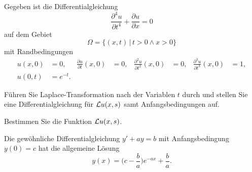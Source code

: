 Gegeben ist die Differentialgleichung
\begin{equation}
\frac{\partial^4 u}{\partial t^4}
+
\frac{\partial u}{\partial x}
=
0
\label{50000013:dgl}
\end{equation}
auf dem Gebiet
\[
\Omega = \{ (x,t)\,|\, t>0\wedge x > 0\}
\]
mit Randbedingungen
\begin{equation}
\begin{aligned}
u(x,0)&=0,
&
\frac{\partial u}{\partial t}(x,0)
&=
0,
&
\frac{\partial^2 u}{\partial t^2}(x,0)
&=
0,
&
\frac{\partial^3 u}{\partial t^3}(x,0)
&=1,
\\
u(0,t)&=e^{-t}.
\end{aligned}
\end{equation}
\begin{teilaufgaben}
\item
Führen Sie Laplace-Transformation nach der Variablen $t$ durch und
stellen Sie eine Differentialgleichung für ${\cal L}u(x,s)$ samt
Anfangsbedingungen auf.
\item
Bestimmen Sie die Funktion ${\cal L}u(x,s)$.
\end{teilaufgaben}

\begin{hinweis}
Die gewöhnliche Differentialgleichung $y'+ay=b$ mit Anfangsbedingung $y(0)=c$
hat die allgemeine Lösung
\[
y(x) = \biggl(c-\frac{b}{a}\biggr)e^{-ax} + \frac{b}{a}.
\]
\end{hinweis}

